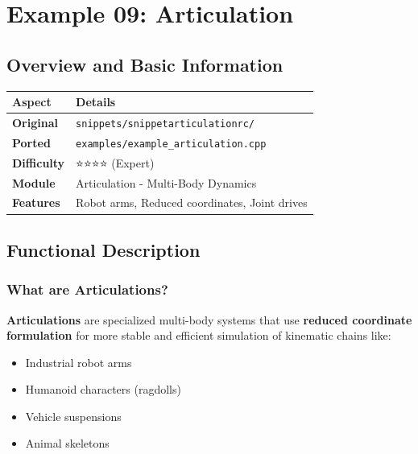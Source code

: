 
\section{Example 09: Articulation}

\subsection{Overview and Basic Information}

\begin{table}[h]
\centering
\begin{tabular}{|l|l|}
\hline
\textbf{Aspect} & \textbf{Details} \\
\hline
\textbf{Original} & \texttt{snippets/snippetarticulationrc/} \\
\textbf{Ported} & \texttt{examples/example\_articulation.cpp} \\
\textbf{Difficulty} & ⭐⭐⭐⭐ (Expert) \\
\textbf{Module} & Articulation - Multi-Body Dynamics \\
\textbf{Features} & Robot arms, Reduced coordinates, Joint drives \\
\hline
\end{tabular}
\end{table}

\subsection{Functional Description}

\subsubsection{What are Articulations?}

\textbf{Articulations} are specialized multi-body systems that use \textbf{reduced coordinate formulation} for more stable and efficient simulation of kinematic chains like:

\begin{itemize}
    \item Industrial robot arms
    \item Humanoid characters (ragdolls)
    \item Vehicle suspensions
    \item Animal skeletons
\end{itemize}

